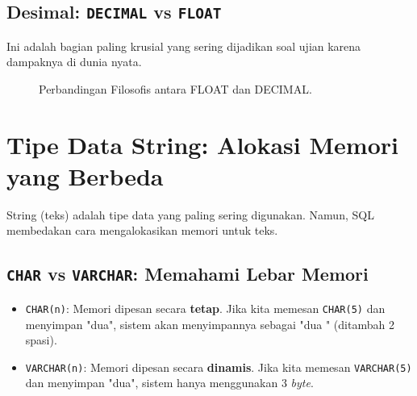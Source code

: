 \documentclass[11pt,a4paper]{article}
\begin{document}
\subsection{Desimal: \texttt{DECIMAL} vs \texttt{FLOAT}}
Ini adalah bagian paling krusial yang sering dijadikan soal ujian karena dampaknya di dunia nyata.

\begin{figure}[H]
	\centering
	\caption{Perbandingan Filosofis antara FLOAT dan DECIMAL.}
\end{figure}

\section{Tipe Data String: Alokasi Memori yang Berbeda}

String (teks) adalah tipe data yang paling sering digunakan. Namun, SQL membedakan cara mengalokasikan memori untuk teks.

\subsection{\texttt{CHAR} vs \texttt{VARCHAR}: Memahami Lebar Memori}
\begin{itemize}
	\item \texttt{CHAR(n)}: Memori dipesan secara \textbf{tetap}. Jika kita memesan \texttt{CHAR(5)} dan menyimpan "dua", sistem akan menyimpannya sebagai "dua  " (ditambah 2 spasi).
	\item \texttt{VARCHAR(n)}: Memori dipesan secara \textbf{dinamis}. Jika kita memesan \texttt{VARCHAR(5)} dan menyimpan "dua", sistem hanya menggunakan 3 \textit{byte}.
\end{itemize}
\end{document}
